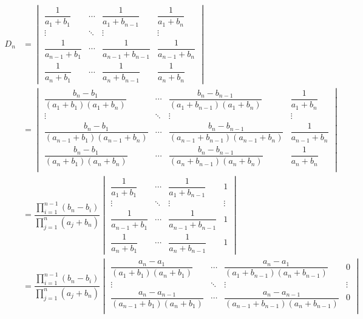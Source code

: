 \begin{solution}
    \begin{align*}
        D_n &= \begin{vmatrix}
            \dfrac{1}{a_1+b_1} & \cdots & \dfrac{1}{a_1+b_{n-1}} & \dfrac{1}{a_1+b_n} \\
            \vdots & \ddots & \vdots & \vdots \\
            \dfrac{1}{a_{n-1}+b_1} & \cdots & \dfrac{1}{a_{n-1}+b_{n-1}} & \dfrac{1}{a_{n-1}+b_n} \\
            \dfrac{1}{a_n+b_1} & \cdots & \dfrac{1}{a_n+b_{n-1}} & \dfrac{1}{a_n+b_n}
        \end{vmatrix} \\
        &= \begin{vmatrix}
            \dfrac{b_n-b_1}{(a_1+b_1)(a_1+b_n)} & \cdots & \dfrac{b_n-b_{n-1}}{(a_1+b_{n-1})(a_1+b_n)} & \dfrac{1}{a_1+b_n} \\
            \vdots & \ddots & \vdots & \vdots \\
            \dfrac{b_n-b_1}{(a_{n-1}+b_1)(a_{n-1}+b_n)} & \cdots & \dfrac{b_n-b_{n-1}}{(a_{n-1}+b_{n-1})(a_{n-1}+b_n)} & \dfrac{1}{a_{n-1}+b_n} \\
            \dfrac{b_n-b_1}{(a_n+b_1)(a_n+b_n)} & \cdots & \dfrac{b_n-b_{n-1}}{(a_n+b_{n-1})(a_n+b_n)} & \dfrac{1}{a_n+b_n} \\
        \end{vmatrix} \\
        &= \dfrac{\prod\limits_{i=1}^{n-1}(b_n-b_i)}{\prod\limits_{j=1}^{n}(a_j+b_n)} \begin{vmatrix}
            \dfrac{1}{a_1+b_1} & \cdots & \dfrac{1}{a_1+b_{n-1}} & 1 \\
            \vdots & \ddots & \vdots & \vdots \\
            \dfrac{1}{a_{n-1}+b_1} & \cdots & \dfrac{1}{a_{n-1}+b_{n-1}} & 1 \\
            \dfrac{1}{a_n+b_1} & \cdots & \dfrac{1}{a_n+b_{n-1}} & 1
        \end{vmatrix} \\
        &= \dfrac{\prod\limits_{i=1}^{n-1}(b_n-b_i)}{\prod\limits_{j=1}^{n}(a_j+b_n)} \begin{vmatrix}
            \dfrac{a_n-a_1}{(a_1+b_1)(a_n+b_1)} & \cdots & \dfrac{a_n-a_1}{(a_1+b_{n-1})(a_n+b_{n-1})} & 0 \\
            \vdots & \ddots & \vdots & \vdots \\
            \dfrac{a_n-a_{n-1}}{(a_{n-1}+b_1)(a_n+b_1)} & \cdots & \dfrac{a_n-a_{n-1}}{(a_{n-1}+b_{n-1})(a_n+b_{n-1})} & 0 \\

\end{vmatrix}
\end{align*}
\end{solution}
